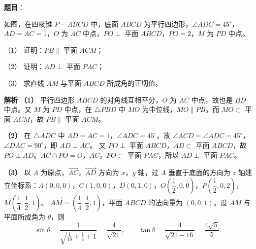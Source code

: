 \begin{answer}

\textbf{题目}：

如图，在四棱锥 $P-ABCD$ 中，底面 $ABCD$ 为平行四边形，$\angle ADC=45^\circ$，$AD=AC=1$，$O$ 为 $AC$ 中点，$PO\perp$ 平面 $ABCD$，$PO=2$，$M$ 为 $PD$ 中点。

（1） 证明：$PB\parallel$ 平面 $ACM$；

（2） 证明：$AD\perp$ 平面 $PAC$；

（3） 求直线 $AM$ 与平面 $ABCD$ 所成角的正切值。
\nopagebreak[4]
\begin{center}\end{center}
\nopagebreak[4]
\textbf{解析}
\textbf{（1）} 平行四边形 $ABCD$ 的对角线互相平分，$O$ 为 $AC$ 中点，故也是 $BD$ 中点。又 $M$ 为 $PD$ 中点，在 $\triangle PBD$ 中 $MO$ 为中位线，$MO\parallel PB$。而 $MO\subset$ 平面 $ACM$，故 $PB\parallel$ 平面 $ACM$。

\textbf{（2）} 在 $\triangle ADC$ 中 $AD=AC=1$，$\angle ADC=45^\circ$，故 $\angle ACD=\angle ADC=45^\circ$，$\angle DAC=90^\circ$，即 $AD\perp AC$。
又 $PO\perp$ 平面 $ABCD$，$AD\subset$ 平面 $ABCD$，故 $PO\perp AD$。$AC\cap PO=O$，$AC$，$PO\subset$ 平面 $PAC$，所以 $AD\perp$ 平面 $PAC$。

\textbf{（3）} 以 $A$ 为原点，$\overrightarrow{AC}$，$\overrightarrow{AD}$ 方向为 $x$，$y$ 轴，过 $A$ 垂直于底面的方向为 $z$ 轴建立坐标系：$A(0,0,0)$，$C(1,0,0)$，$D(0,1,0)$，$O\left(\dfrac12,0,0\right)$，$P\left(\dfrac12,0,2\right)$，$M\left(\dfrac14,\dfrac12,1\right)$。
$\overrightarrow{AM}=\left(\dfrac14,\dfrac12,1\right)$，平面 $ABCD$ 的法向量为 $(0,0,1)$。设 $AM$ 与平面所成角为 $\theta$，则
\nopagebreak[4]
\[\sin\theta=\frac{1}{\sqrt{\frac1{16}+\frac14+1}}=\frac{4}{\sqrt{21}},\qquad \tan\theta=\frac{4}{\sqrt{21-16}}=\frac{4\sqrt5}5.\]




\end{answer}
